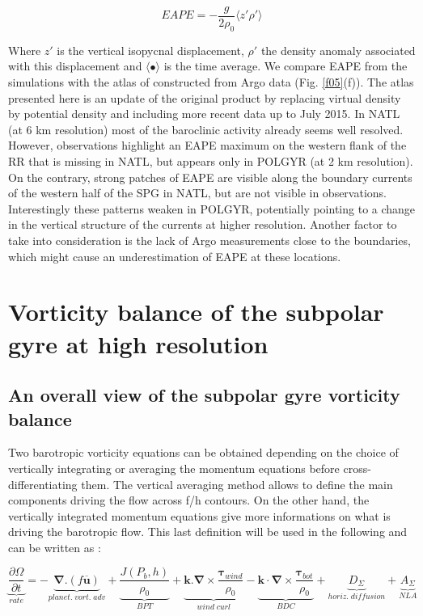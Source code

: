 \documentclass[os, manuscript]{copernicus}
\begin{document}
\begin{equation}
    EAPE = - \frac{g}{2\rho _0} \langle z' \rho ' \rangle
\end{equation}

Where $z'$ is the vertical isopycnal displacement, $\rho '$ the density anomaly associated with this displacement and $\langle \bullet\rangle$ is the time average. We compare EAPE from the simulations with the atlas of \citet{roullet2014} constructed from Argo data (Fig. \ref{f05}(f)). The atlas presented here is an update of the original product by replacing virtual density by potential density and including more recent data up to July 2015. In NATL (at 6 km resolution) most of the baroclinic activity already seems well resolved. However, observations highlight an EAPE maximum on the western flank of the RR that is missing in NATL, but appears only in POLGYR (at 2 km resolution). On the contrary, strong patches of EAPE are visible along the boundary currents of the western half of the SPG in NATL, but are not visible in observations. Interestingly these patterns weaken in POLGYR, potentially pointing to a change in the vertical structure of the currents at higher resolution. Another factor to take into consideration is the lack of Argo measurements close to the boundaries, which might cause an underestimation of EAPE at these locations.

\section{Vorticity balance of the subpolar gyre at high resolution}
\subsection{An overall view of the subpolar gyre vorticity balance}

Two barotropic vorticity equations can be obtained depending on the choice of vertically integrating or averaging the momentum equations before cross-differentiating them. The vertical averaging method allows to define the main components driving the flow across f/h contours. On the other hand, the vertically integrated momentum equations give more informations on what is driving the barotropic flow. This last definition will be used in the following and can be written as \citep{gula2015}:

\begin{equation}
\underbrace{\frac{\partial \Omega}{\partial t}}_{rate} = -\underbrace{\mathbf{\nabla}.(f \mathbf{\overline{u}})}_{planet.\;vort.\;adv}+\underbrace{\frac{J(P_b,h)}{\rho _0}}_{BPT} +\underbrace{\mathbf{k}.\mathbf{\nabla} \times \frac{\mathbf{\tau} _{wind}}{\rho_{0}}}_{wind\;curl} -\underbrace{\mathbf{k} \cdot \mathbf{\nabla} \times \frac{\mathbf{\tau} _{bot}}{\rho_{0}}}_{BDC} +\underbrace{D_{\Sigma}}_{horiz.\;diffusion}+\underbrace{A_{\Sigma}}_{NLA}
\end{equation}
\end{document}
